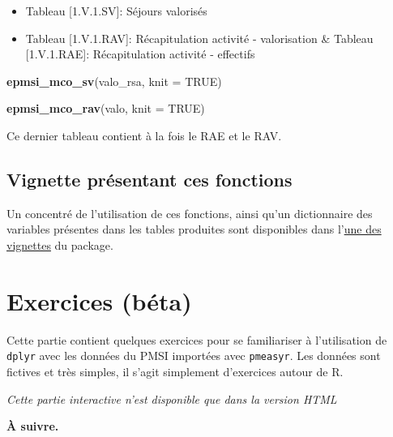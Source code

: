\documentclass[]{book}
\newenvironment{Shaded}{\begin{snugshade}}{\end{snugshade}}
\newcommand{\DataTypeTok}[1]{\textcolor[rgb]{0.13,0.29,0.53}{#1}}
\newcommand{\KeywordTok}[1]{\textcolor[rgb]{0.13,0.29,0.53}{\textbf{#1}}}
\newcommand{\NormalTok}[1]{#1}
\newcommand{\OtherTok}[1]{\textcolor[rgb]{0.56,0.35,0.01}{#1}}
\providecommand{\tightlist}{%
  \setlength{\itemsep}{0pt}\setlength{\parskip}{0pt}}
\begin{document}
\begin{itemize}
\tightlist
\item
  Tableau {[}1.V.1.SV{]}: Séjours valorisés
\item
  Tableau {[}1.V.1.RAV{]}: Récapitulation activité - valorisation \& Tableau {[}1.V.1.RAE{]}: Récapitulation activité - effectifs
\end{itemize}

\begin{Shaded}
\begin{Highlighting}[]
\KeywordTok{epmsi_mco_sv}\NormalTok{(valo_rsa, }\DataTypeTok{knit =} \OtherTok{TRUE}\NormalTok{)}
\end{Highlighting}
\end{Shaded}

\begin{Shaded}
\begin{Highlighting}[]
\KeywordTok{epmsi_mco_rav}\NormalTok{(valo, }\DataTypeTok{knit =} \OtherTok{TRUE}\NormalTok{)}
\end{Highlighting}
\end{Shaded}

Ce dernier tableau contient à la fois le RAE et le RAV.

\hypertarget{vignette-presentant-ces-fonctions}{%
\section{Vignette présentant ces fonctions}\label{vignette-presentant-ces-fonctions}}

Un concentré de l'utilisation de ces fonctions, ainsi qu'un dictionnaire des variables présentes dans les tables produites sont disponibles dans l'\href{https://im-aphp.github.io/pmeasyr/articles/vignette4.html}{une des vignettes} du package.

\hypertarget{exercices-beta}{%
\chapter{Exercices (béta)}\label{exercices-beta}}

Cette partie contient quelques exercices pour se familiariser à l'utilisation de \texttt{dplyr} avec les données du PMSI importées avec \texttt{pmeasyr}. Les données sont fictives et très simples, il s'agit simplement d'exercices autour de R.

\begin{center}\textit{Cette partie interactive n'est disponible que dans la version HTML}\end{center}

\textbf{À suivre.}
\end{document}
